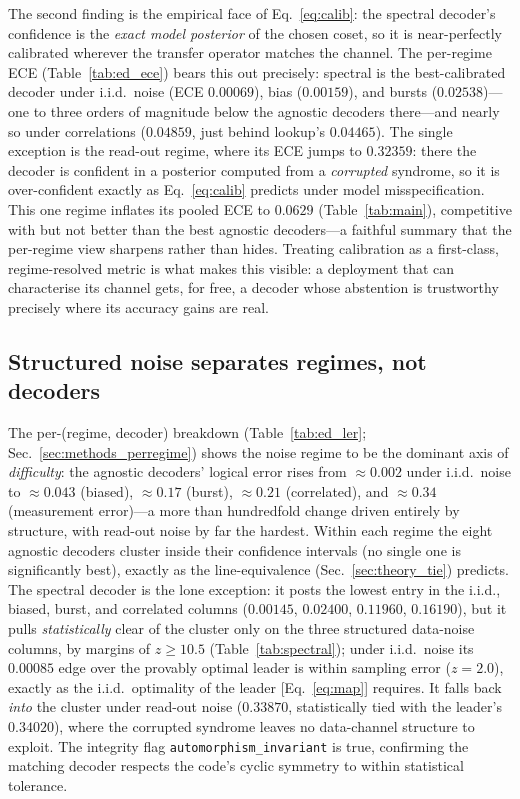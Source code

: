\documentclass[reprint,aps,prxquantum,amsmath,amssymb,floatfix,nofootinbib,longbibliography]{revtex4-2}
\theoremstyle{definition}
\theoremstyle{remark}
\theoremstyle{plain}
\newcommand{\sync}[1]{#1}
\begin{document}
The second finding is the empirical face of Eq.~\eqref{eq:calib}: the spectral decoder's confidence is the \emph{exact model posterior} of the chosen coset, so it is near-perfectly calibrated wherever the transfer operator matches the channel. The per-regime ECE (Table~\ref{tab:ed_ece}) bears this out precisely: spectral is the best-calibrated decoder under i.i.d.\ noise (ECE $\sync{0.00069}$), bias ($\sync{0.00159}$), and bursts ($\sync{0.02538}$)---one to three orders of magnitude below the agnostic decoders there---and nearly so under correlations ($\sync{0.04859}$, just behind lookup's $\sync{0.04465}$). The single exception is the read-out regime, where its ECE jumps to $\sync{0.32359}$: there the decoder is confident in a posterior computed from a \emph{corrupted} syndrome, so it is over-confident exactly as Eq.~\eqref{eq:calib} predicts under model misspecification. This one regime inflates its pooled ECE to $\sync{0.0629}$ (Table~\ref{tab:main}), competitive with but not better than the best agnostic decoders---a faithful summary that the per-regime view sharpens rather than hides. Treating calibration as a first-class, regime-resolved metric is what makes this visible: a deployment that can characterise its channel gets, for free, a decoder whose abstention is trustworthy precisely where its accuracy gains are real.

\subsection{Structured noise separates regimes, not decoders}
\label{sec:per_regime}

The per-(regime, decoder) breakdown (Table~\ref{tab:ed_ler}; Sec.~\ref{sec:methods_perregime}) shows the noise regime to be the dominant axis of \emph{difficulty}: the agnostic decoders' logical error rises from $\approx\sync{0.002}$ under i.i.d.\ noise to $\approx\sync{0.043}$ (biased), $\approx\sync{0.17}$ (burst), $\approx\sync{0.21}$ (correlated), and $\approx\sync{0.34}$ (measurement error)---a more than hundredfold change driven entirely by structure, with read-out noise by far the hardest. Within each regime the eight agnostic decoders cluster inside their confidence intervals (no single one is significantly best), exactly as the line-equivalence (Sec.~\ref{sec:theory_tie}) predicts. The spectral decoder is the lone exception: it posts the lowest entry in the i.i.d., biased, burst, and correlated columns ($\sync{0.00145}$, $\sync{0.02400}$, $\sync{0.11960}$, $\sync{0.16190}$), but it pulls \emph{statistically} clear of the cluster only on the three structured data-noise columns, by margins of $z\ge\sync{10.5}$ (Table~\ref{tab:spectral}); under i.i.d.\ noise its $\sync{0.00085}$ edge over the provably optimal leader is within sampling error ($z=\sync{2.0}$), exactly as the i.i.d.\ optimality of the leader [Eq.~\eqref{eq:map}] requires. It falls back \emph{into} the cluster under read-out noise ($\sync{0.33870}$, statistically tied with the leader's $\sync{0.34020}$), where the corrupted syndrome leaves no data-channel structure to exploit. The integrity flag \texttt{automorphism\_invariant} is \sync{true}, confirming the matching decoder respects the code's cyclic symmetry to within statistical tolerance.
\end{document}
